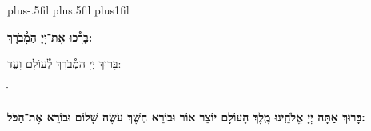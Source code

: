 \documentclass[twoside, openany, parskip=half, 11pt]{book}
\begin{document}
\newcommand{\barachu}{
\begin{minipage}{0.6\textwidth}
\leftskip=0pt plus-.5fil
\rightskip=0pt plus.5fil
\parfillskip=0pt plus1fil
\begin{large}

\shatz
\begin{Large}\textbf{בָּרְ֯כוּ אֶת־יְיָ הַמְ֯בֹרָךְ:}\end{Large}
\end{large}

\vspace{12pt}

\shatzvkahal
בָּרוּךְ יְיָ הַמְ֯בֹרָךְ לְ֯עוֹלָם וָעֶד:
\end{minipage}
ֺֺ%

%
}


\barachu

\textbf{
בָּרוּךְ אַתָּה יְיָ אֱלֹהֵֽינוּ מֶֽלֶךְ הָעוֹלָם יוֹצֵר אוֹר וּבוֹרֵא חֹֽשֶׁךְ עֹשֶׂה שָׁלוֹם וּבוֹרֵא אֶת־הַכֹּל:
}

\newcommand{\hameir}{
\firstword{הַמֵּאִיר}
לָאָֽרֶץ וְ֯לַדָּרִים עָלֶֽיהָ בְּ֯רַחֲמִים וּבְטוּבוֹ מְ֯חַדֵּשׁ בְּ֯כׇל־יוֹם תָּמִיד מַעֲשֵׂה בְ֯רֵאשִׁית: \source{תהלים קד}מָה־רַבּ֬וּ מַעֲשֶׂ֨יךָ ׀ יְיָ֗ כֻּ֭לָּם בְּ֯חׇכְמָ֣ה עָשִׂ֑יתָ מָלְ֯אָ֥ה הָ֝אָ֗רֶץ קִנְיָנֶֽךָ׃ הַמֶּֽלֶךְ הַמְ֯רוֹמָם לְ֯בַדּוֹ מֵאָז הַמְ֯שֻׁבָּח וְ֯הַמְ֯פֹאָר וְ֯הַמִּתְנַשֵּׂא מִימוֹת עוֹלָם: אֱלֹהֵי עוֹלָם בְּ֯רַחֲמֶיךָ הָרַבִּים רַחֵם עָלֵינוּ אֲדוֹן עֻזֵּֽנוּ צוּר מִשְׂגַּבֵּנוּ מָגֵן יִשְׁעֵֽנוּ מִשְׂגָּב בַּעֲדֵֽנוּ: אֵ֗ל בָּ֗רוּךְ גְּ֯֗דוֹל דֵּ֗עָה הֵ֗כִין וּ֗פָעַל זׇׇׇׇׇׇׇׇׇׇ֗הֳרֵי חַ֗מָּה ט֗וֹב יָ֗צַר כָּ֗בוֹד לִ֗שְׁמוֹ מְ֯֗אוֹרוֹת נָ֗תַן סְ֯֗בִיבוֹת עֻ֗זּוֹ פִּ֗נּוֹת צְ֯֗בָאָיו קְ֯֗דוֹשִׁים ר֗וֹמֲמֵי שַׁ֗דַּי תָּ֗מִיד מְ֯סַפְּ֯רִים כְּ֯בוֹד־אֵל וּקְדֻשָׁתוֹ: תִּתְבָּרַךְ יְיָ אֱלֹהֵֽינוּ עַל־שֶׁבַח מַעֲשֵׂי יָדֶֽיךָ וְ֯עַל־מְ֯אֽוֹרֵי אוֹר שֶׁעָשִֽׂיתָ יְ֯פָאֲרֽוּךָ סֶּֽלָה:
}

\newcommand{\kadoshkadoshkadosh}{•}
\end{document}
